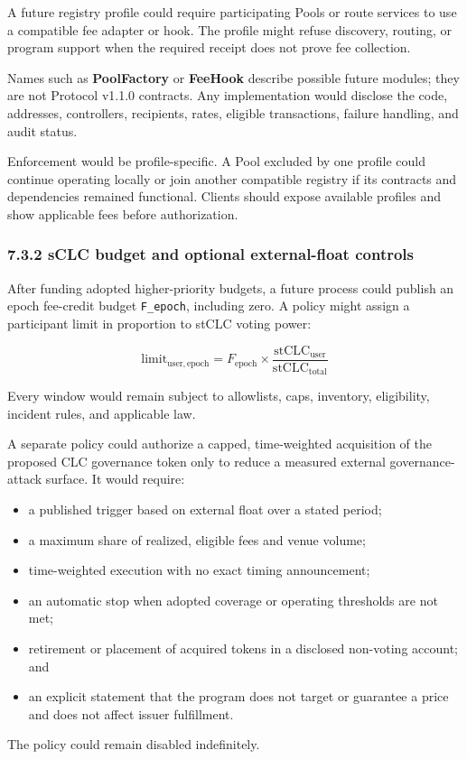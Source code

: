 \documentclass[11pt]{article}
\begin{document}
A future registry profile could require participating Pools or route services to use a compatible fee adapter or hook. The profile might refuse discovery, routing, or program support when the required receipt does not prove fee collection.

Names such as \textbf{PoolFactory} or \textbf{FeeHook} describe possible future modules; they are not Protocol v1.1.0 contracts. Any implementation would disclose the code, addresses, controllers, recipients, rates, eligible transactions, failure handling, and audit status.

Enforcement would be profile-specific. A Pool excluded by one profile could continue operating locally or join another compatible registry if its contracts and dependencies remained functional. Clients should expose available profiles and show applicable fees before authorization.

\subsubsection*{7.3.2 sCLC budget and optional external-float controls}

After funding adopted higher-priority budgets, a future process could publish an epoch fee-credit budget \texttt{F\_epoch}, including zero. A policy might assign a participant limit in proportion to stCLC voting power:

\[
\mathrm{limit}_{\mathrm{user,epoch}} = F_{\mathrm{epoch}} \times \frac{\mathrm{stCLC}_{\mathrm{user}}}{\mathrm{stCLC}_{\mathrm{total}}}
\]

Every window would remain subject to allowlists, caps, inventory, eligibility, incident rules, and applicable law.

A separate policy could authorize a capped, time-weighted acquisition of the proposed CLC governance token only to reduce a measured external governance-attack surface. It would require:

\begin{itemize}[leftmargin=*]
\item a published trigger based on external float over a stated period;
\item a maximum share of realized, eligible fees and venue volume;
\item time-weighted execution with no exact timing announcement;
\item an automatic stop when adopted coverage or operating thresholds are not met;
\item retirement or placement of acquired tokens in a disclosed non-voting account; and
\item an explicit statement that the program does not target or guarantee a price and does not affect issuer fulfillment.
\end{itemize}
The policy could remain disabled indefinitely.
\end{document}
